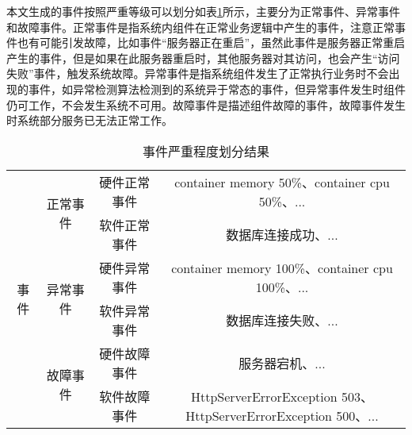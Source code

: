 本文生成的事件按照严重等级可以划分如表\ref{event-type}所示，主要分为正常事件、异常事件和故障事件。正常事件是指系统内组件在正常业务逻辑中产生的事件，注意正常事件也有可能引发故障，比如事件“服务器正在重启”，虽然此事件是服务器正常重启产生的事件，但是如果在此服务器重启时，其他服务器对其访问，也会产生“访问失败”事件，触发系统故障。异常事件是指系统组件发生了正常执行业务时不会出现的事件，如异常检测算法检测到的系统异于常态的事件，但异常事件发生时组件仍可工作，不会发生系统不可用。故障事件是描述组件故障的事件，故障事件发生时系统部分服务已无法正常工作。
\begin{table}[]
    \caption{事件严重程度划分结果}
    \label{event-type}
    \begin{tabular}{cccc}
    \hline
    \multirow{6}{*}{事件} & \multirow{2}{*}{正常事件} & 硬件正常事件 & container memory 50\%、container cpu 50\%、...                  \\
                        &                       & 软件正常事件 & 数据库连接成功、...                                                   \\ \cline{2-4} 
                        & \multirow{2}{*}{异常事件} & 硬件异常事件 & container memory 100\%、container cpu 100\%、...                \\
                        &                       & 软件异常事件 & 数据库连接失败、...                                                   \\ \cline{2-4} 
                        & \multirow{2}{*}{故障事件} & 硬件故障事件 & 服务器宕机、...                                                     \\
                        &                       & 软件故障事件 & \tabincell{l}{HttpServerErrorException 503、\\HttpServerErrorException 500、...} \\ \hline
    \end{tabular}
    \end{table}

